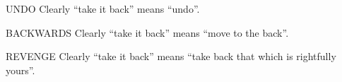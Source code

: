 \begin{switch}
\item{UNDO}
  Clearly ``take it back'' means ``undo''.
\item{BACKWARDS}
  Clearly ``take it back'' means ``move to the back''.
\item{REVENGE}
  Clearly ``take it back'' means
  ``take back that which is rightfully yours''.
\end{switch}


